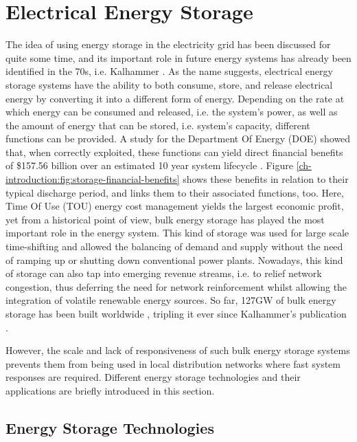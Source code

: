 \section{Electrical Energy Storage}
\label{ch-introduction:sec:energy-storage}

The idea of using energy storage in the electricity grid has been discussed for quite some time, and its important role in future energy systems has already been identified in the 70s, i.e. Kalhammer \cite{Kalhammer1979}.
As the name suggests, electrical energy storage systems have the ability to both consume, store, and release electrical energy by converting it into a different form of energy.
Depending on the rate at which energy can be consumed and released, i.e. the system's power, as well as the amount of energy that can be stored, i.e. system's capacity, different functions can be provided.
A study for the Department Of Energy (DOE) showed that, when correctly exploited, these functions can yield direct financial benefits of \$157.56 billion over an estimated 10 year system lifecycle \cite{Eyer2010a}.
Figure \ref{ch-introduction:fig:storage-financial-benefits} shows these benefits in relation to their typical discharge period, and links them to their associated functions, too.
Here, Time Of Use (TOU) energy cost management yields the largest economic profit, yet from a historical point of view, bulk energy storage has played the most important role in the energy system.
This kind of storage was used for large scale time-shifting and allowed the balancing of demand and supply without the need of ramping up or shutting down conventional power plants.
Nowadays, this kind of storage can also tap into emerging revenue streams, i.e. to relief network congestion, thus deferring the need for network reinforcement whilst allowing the integration of volatile renewable energy sources.
So far, 127GW of bulk energy storage has been built worldwide \cite{Rehman2015}, tripling it ever since Kalhammer's publication \cite{Barbour2015, Barbour2016}.



However, the scale and lack of responsiveness of such bulk energy storage systems prevents them from being used in local distribution networks where fast system responses are required.
Different energy storage technologies and their applications are briefly introduced in this section.

\subsection{Energy Storage Technologies}

